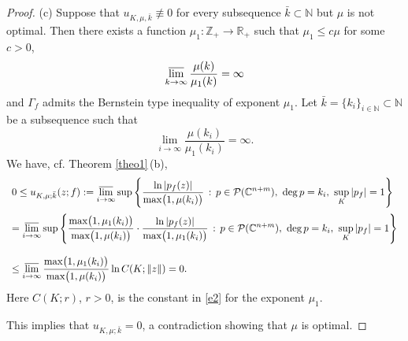 \documentclass[11pt, oneside]{amsart}
\begin{document}
\begin{proof}
(c) Suppose that $u_{K,\mu,\bar k}\not\equiv 0$ for every subsequence $\bar k\subset\mathbb N$ but $\mu$ is not optimal. Then there exists a function $\mu_1:\mathbb Z_+\rightarrow\mathbb R_+$ such that $\mu_1\le c\mu$ for some $c>0$, 
\[
\varlimsup_{k\rightarrow\infty}\frac{\mu(k)}{\mu_1(k)}=\infty
\]
and $\Gamma_f$ admits the Bernstein type inequality of exponent $\mu_1$. Let $\bar k=\{k_i\}_{i\in\mathbb N}\subset\mathbb N$ be a subsequence such that
\[
\lim_{i\rightarrow\infty}\frac{\mu(k_i)}{\mu_1(k_i)}=\infty.
\]
We have, cf. Theorem \ref{theo1}\,(b),
\[
\begin{array}{l}
\displaystyle
0\le u_{K,\mu;\bar k}(z;f):=\varlimsup_{i\rightarrow\infty}\sup\left\{\frac{\ln |p_f(z)|}{\max\bigl(1,\mu(k_i)\bigr)}\, :\, p\in\mathcal P(\mathbb C^{n+m}),\ {\rm deg}\,p= k_i,\ \sup_K |p_f|=1\right\}\medskip\\
\displaystyle =\varlimsup_{i\rightarrow\infty}\sup\left\{\frac{\max\bigl(1,\mu_1(k_i)\bigr)}{\max\bigl(1,\mu(k_i)\bigr)}\cdot\frac{\ln |p_f(z)|}{\max\bigl(1,\mu_1(k_i)\bigr)}\, :\, p\in\mathcal P(\mathbb C^{n+m}),\ {\rm deg}\,p= k_i,\ \sup_K |p_f|=1\right\}\\
\\
\displaystyle \le \varlimsup_{i\rightarrow\infty}\frac{\max\bigl(1,\mu_1(k_i)\bigr)}{\max\bigl(1,\mu(k_i)\bigr)} \ln C(K;\|z\|)=0.
\end{array}
\]
Here $C(K;r)$, $r>0$, is the constant in \eqref{e2} for the exponent $\mu_1$.

This implies that $u_{K,\mu;\bar k}= 0$, a contradiction showing that $\mu$ is optimal.\smallskip


\end{proof}
\end{document}
